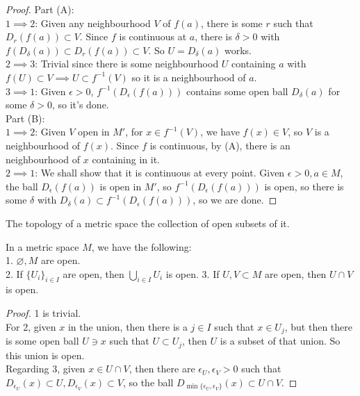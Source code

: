 \begin{proof}
    Part (A):\\
    $1\implies 2$: Given any neighbourhood $V$ of $f(a)$, there is some $r$ such that $D_r(f(a))\subset V$.
    Since $f$ is continuous at $a$, there is $\delta>0$ with $f(D_\delta(a))\subset D_r(f(a))\subset V$.
    So $U=D_\delta(a)$ works.\\
    $2\implies 3$: Trivial since there is some neighbourhood $U$ containing $a$ with $f(U)\subset V\implies U\subset f^{-1}(V)$ so it is a neighbourhood of $a$.\\
    $3\implies 1$: Given $\epsilon>0$, $f^{-1}(D_\epsilon(f(a)))$ contains some open ball $D_\delta(a)$ for some $\delta>0$, so it's done.\\
    Part (B):\\
    $1\implies 2$: Given $V$ open in $M'$, for $x\in f^{-1}(V)$, we have $f(x)\in V$, so $V$ is a neighbourhood of $f(x)$.
    Since $f$ is continuous, by (A), there is an neighbourhood of $x$ containing in it.\\
    $2\implies 1$: We shall show that it is continuous at every point.
    Given $\epsilon>0,a\in M$, the ball $D_\epsilon(f(a))$ is open in $M'$, so $f^{-1}(D_\epsilon(f(a)))$ is open, so there is some $\delta$ with $D_\delta(a)\subset f^{-1}(D_\epsilon(f(a)))$, so we are done.
\end{proof}
\begin{definition}
    The topology of a metric space the collection of open subsets of it.
\end{definition}
\begin{proposition}\label{metric_topology}
    In a metric space $M$, we have the following:\\
    1. $\varnothing,M$ are open.\\
    2. If $\{U_i\}_{i\in I}$ are open, then $\bigcup_{i\in I}U_i$ is open.
    3. If $U,V\subset M$ are open, then $U\cap V$ is open.
\end{proposition}
\begin{proof}
    1 is trivial.\\
    For 2, given $x$ in the union, then there is a $j\in I$ such that $x\in U_j$, but then there is some open ball $U\ni x$ such that $U\subset U_j$, then $U$ is a subset of that union.
    So this union is open.\\
    Regarding 3, given $x\in U\cap V$, then there are $\epsilon_U,\epsilon_V>0$ such that $D_{\epsilon_U}(x)\subset U,D_{\epsilon_V}(x)\subset V$, so the ball $D_{\min\{\epsilon_U,\epsilon_V\}}(x)\subset U\cap V$.
\end{proof}
